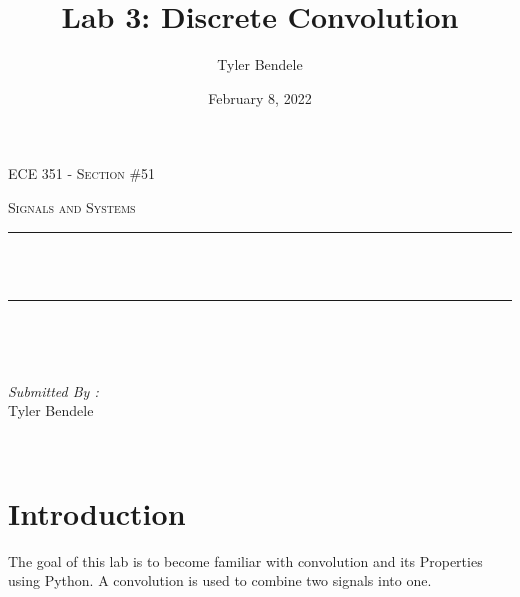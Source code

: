 \documentclass[12pt]{report}
\title{Lab 3: Discrete Convolution}
\author{Tyler Bendele}
\date{February 8, 2022}
\makeatletter
\let\thetitle\@title
\makeatother
\begin{document}
\begin{titlepage}
\centering
\vspace*{0.5 cm}

\begin{center}    \textsc{\Large   ECE 351 - Section \#51 }\\[2.0 cm]
\end{center}%
\textsc{\Large Signals and Systems  }\\[0.5 cm] %

\rule{\linewidth}{0.2 mm} \\[0.4 cm]
{ \huge \bfseries \thetitle}\\
\rule{\linewidth}{0.2 mm} \\[1.5 cm]
\begin{minipage}{0.4\textwidth}
\begin{flushleft} \large
\end{flushleft}
\end{minipage}~
\begin{minipage}{0.4\textwidth}
\begin{flushright} \large
\emph{Submitted By :} \\
Tyler Bendele
\end{flushright}
\end{minipage}\\[2 cm]
\end{titlepage}
\tableofcontents
\pagebreak
\renewcommand{\thesection}{\arabic{section}}
\section{Introduction}
The goal of this lab is to become familiar with convolution and its 
Properties using Python. A convolution is used to combine two signals 
into one.
\end{document}
